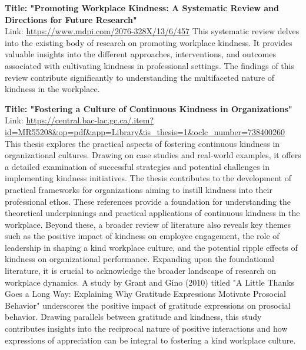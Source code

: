 \documentclass[a4paper, 11pt]{report}
\begin{document}
\noindent\textbf{Title: "Promoting Workplace Kindness: A Systematic Review and Directions for Future Research"} 
\\
Link: \url{https://www.mdpi.com/2076-328X/13/6/457}
\vspace{5mm} %
\newline
This systematic review delves into the existing body of research on promoting workplace kindness. It provides valuable insights into the different approaches, interventions, and outcomes associated with cultivating kindness in professional settings. The findings of this review contribute significantly to understanding the multifaceted nature of kindness in the workplace.

\vspace{5mm} %
\newline
\noindent\textbf{Title: "Fostering a Culture of Continuous Kindness in Organizations"}
\\
Link: \url{https://central.bac-lac.gc.ca/.item?id=MR55208&op=pdf&app=Library&is_thesis=1&oclc_number=738400260}
\vspace{5mm} %
\newline
This thesis explores the practical aspects of fostering continuous kindness in organizational cultures. Drawing on case studies and real-world examples, it offers a detailed examination of successful strategies and potential challenges in implementing kindness initiatives. The thesis contributes to the development of practical frameworks for organizations aiming to instill kindness into their professional ethos.
\vspace{5mm} %
\newline
These references provide a foundation for understanding the theoretical underpinnings and practical applications of continuous kindness in the workplace. Beyond these, a broader review of literature also reveals key themes such as the positive impact of kindness on employee engagement, the role of leadership in shaping a kind workplace culture, and the potential ripple effects of kindness on organizational performance.
\vspace{5mm} %
\newline
Expanding upon the foundational literature, it is crucial to acknowledge the broader landscape of research on workplace dynamics. A study by Grant and Gino (2010) titled "A Little Thanks Goes a Long Way: Explaining Why Gratitude Expressions Motivate Prosocial Behavior" underscores the positive impact of gratitude expressions on prosocial behavior. Drawing parallels between gratitude and kindness, this study contributes insights into the reciprocal nature of positive interactions and how expressions of appreciation can be integral to fostering a kind workplace culture.
\end{document}
